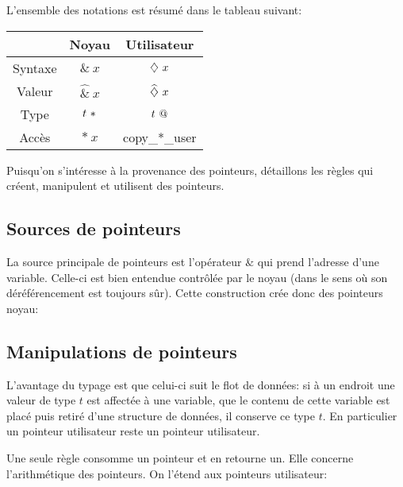 L'ensemble des notations est résumé dans le tableau suivant:

\begin{center}
\begin{tabular}{ccc}
\toprule
        & Noyau      & Utilisateur \\
\midrule
Syntaxe & $\&~x$     & $\eTaint{x}$ \\
Valeur  & $\widehat{\&}~x$ & $\vTainted{x}$ \\
Type    & $\ptrK{t}$ & $\ptrU{t}$ \\
Accès   & $*~x$      & copy\_*\_user \\
\bottomrule
\end{tabular}
\end{center}

Puisqu'on s'intéresse à la provenance des pointeurs, détaillons les règles qui
créent, manipulent et utilisent des pointeurs.

\subsection*{Sources de pointeurs}

La source principale de pointeurs est l'opérateur $\&$ qui prend l'adresse d'une
variable. Celle-ci est bien entendue contrôlée par le noyau (dans le sens où son
déréférencement est toujours sûr). Cette construction crée donc des pointeurs
noyau:

\begin{mathpar}
\end{mathpar}

\subsection*{Manipulations de pointeurs}

L'avantage du typage est que celui-ci suit le flot de données: si à un endroit
une valeur de type $t$ est affectée à une variable, que le contenu de cette
variable est placé puis retiré d'une structure de données, il conserve ce type
$t$. En particulier un pointeur utilisateur reste un pointeur utilisateur.

Une seule règle consomme un pointeur et en retourne un. Elle concerne
l'arithmétique des pointeurs. On l'étend aux pointeurs utilisateur:

\begin{mathpar}
\end{mathpar}

